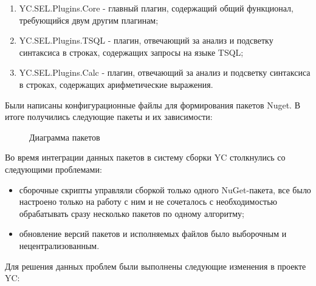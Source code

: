 \documentclass{matmex-diploma-custom}
\begin{document}
\begin{enumerate}
\item
YC.SEL.Plugins.Core - главный плагин, содержащий общий функционал, требующийся двум другим плагинам;
\item
YC.SEL.Plugins.TSQL - плагин, отвечающий за анализ и подсветку синтаксиса в строках, содержащих запросы на языке TSQL;
\item
YC.SEL.Plugins.Calc - плагин, отвечающий за анализ и подсветку синтаксиса в строках, содержащих арифметические выражения.
\end{enumerate}

Были написаны конфигурационные файлы для формирования пакетов Nuget. В итоге получились следующие пакеты и их зависимости:


\begin{figure}[h!]
	\caption{Диаграмма пакетов}
\end{figure}

Во время интеграции данных пакетов в систему сборки YC столкнулись со следующими проблемами:

\begin{itemize}
\item
сборочные скрипты управляли сборкой только одного NuGet-пакета, все было настроено только на работу с ним и не сочеталось с необходимостью обрабатывать сразу несколько пакетов по одному алгоритму;
\item
обновление версий пакетов и исполняемых файлов было выборочным и нецентрализованным.
\end{itemize}

Для решения данных проблем были выполнены следующие изменения в проекте YC:
\end{document}
